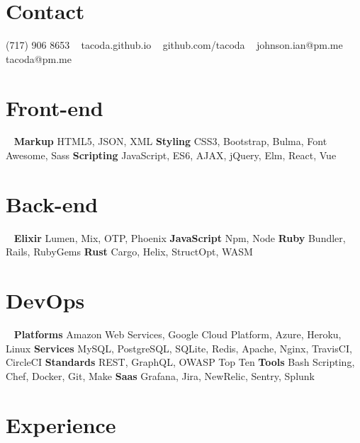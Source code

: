 \documentclass[]{cv-style}          %
\begin{document}


\begin{aside}
%
\section{Contact}
(717) 906 8653
~
tacoda.github.io
~
github.com/tacoda
~
johnson.ian@pm.me
tacoda@pm.me
%
\section{Front-end}
~
\textbf{Markup}
HTML5, JSON, XML
\textbf{Styling}
CSS3, Bootstrap, Bulma, Font Awesome, Sass
\textbf{Scripting}
JavaScript, ES6, AJAX, jQuery, Elm, React, Vue
\section{Back-end}
~
\textbf{Elixir}
Lumen, Mix, OTP, Phoenix
\textbf{JavaScript}
Npm, Node
\textbf{Ruby}
Bundler, Rails, RubyGems
\textbf{Rust}
Cargo, Helix, StructOpt, WASM
\section{DevOps}
~
\textbf{Platforms}
Amazon Web Services, Google Cloud Platform, Azure, Heroku, Linux
\textbf{Services}
MySQL, PostgreSQL, SQLite, Redis, Apache, Nginx, TravisCI, CircleCI
\textbf{Standards}
REST, GraphQL, OWASP Top Ten
\textbf{Tools}
Bash Scripting, Chef, Docker, Git, Make
\textbf{Saas}
Grafana, Jira, NewRelic, Sentry, Splunk
\end{aside}


\section{Experience}
\end{document}
